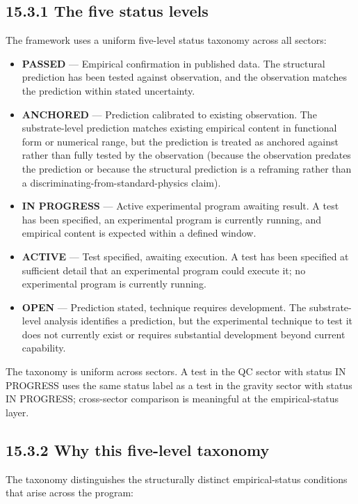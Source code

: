 \documentclass[11pt]{book}
\begin{document}
\subsection{15.3.1 The five status levels}

The framework uses a uniform five-level status taxonomy across all sectors:

\begin{itemize}
\item \textbf{PASSED} — Empirical confirmation in published data. The structural prediction has been tested against observation, and the observation matches the prediction within stated uncertainty.
\item \textbf{ANCHORED} — Prediction calibrated to existing observation. The substrate-level prediction matches existing empirical content in functional form or numerical range, but the prediction is treated as anchored against rather than fully tested by the observation (because the observation predates the prediction or because the structural prediction is a reframing rather than a discriminating-from-standard-physics claim).
\item \textbf{IN PROGRESS} — Active experimental program awaiting result. A test has been specified, an experimental program is currently running, and empirical content is expected within a defined window.
\item \textbf{ACTIVE} — Test specified, awaiting execution. A test has been specified at sufficient detail that an experimental program could execute it; no experimental program is currently running.
\item \textbf{OPEN} — Prediction stated, technique requires development. The substrate-level analysis identifies a prediction, but the experimental technique to test it does not currently exist or requires substantial development beyond current capability.
\end{itemize}

The taxonomy is uniform across sectors. A test in the QC sector with status IN PROGRESS uses the same status label as a test in the gravity sector with status IN PROGRESS; cross-sector comparison is meaningful at the empirical-status layer.

\subsection{15.3.2 Why this five-level taxonomy}

The taxonomy distinguishes the structurally distinct empirical-status conditions that arise across the program:
\end{document}
